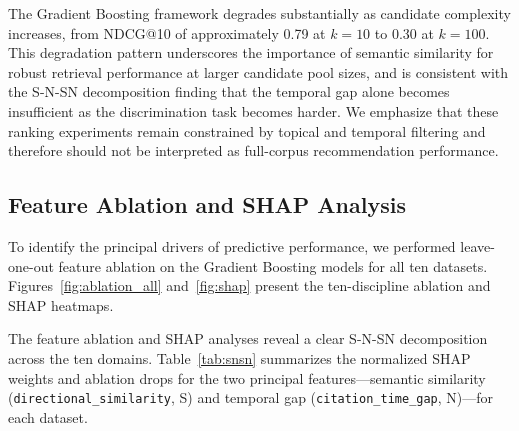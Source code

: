 \documentclass[11pt,a4paper]{article}
\begin{document}
The Gradient Boosting framework degrades substantially as candidate complexity increases, from NDCG@10 of approximately 0.79 at $k=10$ to 0.30 at $k=100$. This degradation pattern underscores the importance of semantic similarity for robust retrieval performance at larger candidate pool sizes, and is consistent with the S-N-SN decomposition finding that the temporal gap alone becomes insufficient as the discrimination task becomes harder. We emphasize that these ranking experiments remain constrained by topical and temporal filtering and therefore should not be interpreted as full-corpus recommendation performance.

\subsection{Feature Ablation and SHAP Analysis}
\label{sec:ablation}

To identify the principal drivers of predictive performance, we performed leave-one-out feature ablation on the Gradient Boosting models for all ten datasets. Figures~\ref{fig:ablation_all} and~\ref{fig:shap} present the ten-discipline ablation and SHAP heatmaps.


The feature ablation and SHAP analyses reveal a clear S-N-SN decomposition across the ten domains. Table~\ref{tab:snsn} summarizes the normalized SHAP weights and ablation drops for the two principal features---semantic similarity (\texttt{directional\_similarity}, S) and temporal gap (\texttt{citation\_time\_gap}, N)---for each dataset.

\begin{table}[H]
\centering
\caption{S-N-SN decomposition: normalized SHAP weights and leave-one-out AUC drops for semantic similarity (S) and temporal gap (N) across all ten datasets.}
\label{tab:snsn}
\end{table}
\end{document}
